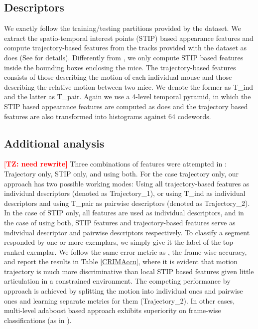 \documentclass[10pt,twocolumn,letterpaper]{article}
\newcommand{\todd}[1]{\textcolor{red}{[\bf TZ: #1]}}
\begin{document}
\subsection{Descriptors}

We exactly follow the training/testing partitions provided by the dataset. We extract the spatio-temporal interest points (STIP) based appearance features and compute trajectory-based features from the tracks provided with the dataset as \cite{CRIM13} does (See \cite{CRIM13} for details). Differently from \cite{CRIM13}, we only compute STIP based features inside the bounding boxes enclosing the mice. The trajectory-based features consists of those describing the motion of each individual mouse and those describing the relative motion between two mice. We denote the former as T\_ind and the latter as T\_pair. Again we use a 4-level temporal pyramid, in which the STIP based appearance features are computed as \cite{CRIM13} does and the trajectory based features are also transformed into histograms against 64 codewords. 

\subsection{Additional analysis}

\todd{need rewrite}
Three combinations of features were attempted in \cite{CRIM13}: Trajectory only, STIP only, and using both. For the case trajectory only, our approach has two possible working modes: Using all trajectory-based features as individual descriptors (denoted as Trajectory\_1), or using T\_ind as individual descriptors and using T\_pair as pairwise descriptors (denoted as Trajectory\_2). In the case of STIP only, all features are used as individual descriptors, and in the case of using both, STIP features and trajectory-based features serve as individual descriptor and pairwise descriptors respectively. To classify a segment responded by one or more exemplars, we simply give it the label of the top-ranked exemplar. We follow the same error metric as \cite{CRIM13}, the frame-wise accuracy, and report the results in Table \ref{CRIMAccu}, where it is evident that motion trajectory is much more discriminative than local STIP based features given little articulation in a constrained environment. The competing performance by approach is achieved by splitting the motion into individual ones and pairwise ones and learning separate metrics for them (Trajectory\_2). In other cases, multi-level adaboost based approach exhibits superiority on frame-wise classifications (as in \cite{CRIM13}).
\end{document}
